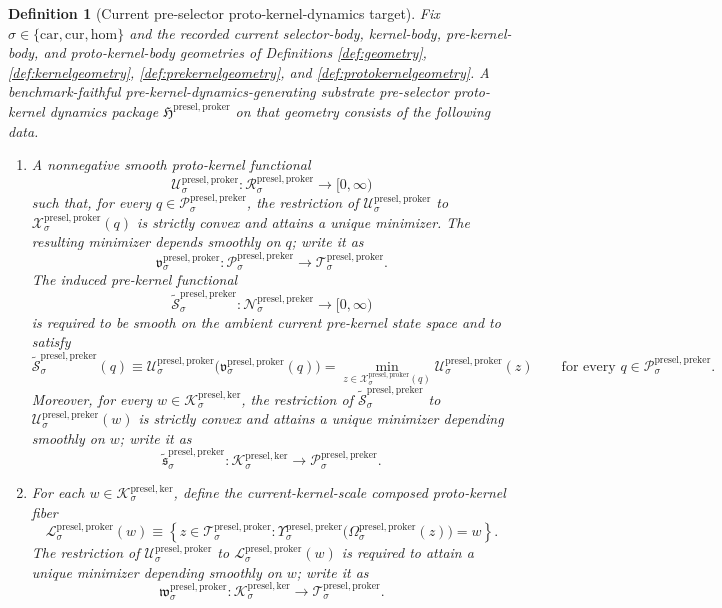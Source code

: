 \documentclass[11pt]{article}
\newcommand{\Car}{\mathrm{car}}
\newcommand{\Cur}{\mathrm{cur}}
\newcommand{\Hom}{\mathrm{hom}}
\newcommand{\KernelBody}[1]{\mathcal K_{#1}^{\mathrm{presel,ker}}}
\newcommand{\PreKernelSpace}[1]{\mathcal N_{#1}^{\mathrm{presel,preker}}}
\newcommand{\PreKernelBody}[1]{\mathcal P_{#1}^{\mathrm{presel,preker}}}
\newcommand{\PreKernelProj}[1]{\Upsilon_{#1}^{\mathrm{presel,preker}}}
\newcommand{\PreKernelFiber}[2]{\mathcal U_{#1}^{\mathrm{presel,preker}}(#2)}
\newcommand{\ProtoKernelPackage}{\mathfrak H^{\mathrm{presel,proker}}}
\newcommand{\ProtoKernelSpace}[1]{\mathcal R_{#1}^{\mathrm{presel,proker}}}
\newcommand{\ProtoKernelBody}[1]{\mathcal T_{#1}^{\mathrm{presel,proker}}}
\newcommand{\ProtoKernelProj}[1]{\Omega_{#1}^{\mathrm{presel,proker}}}
\newcommand{\ProtoKernelFiber}[2]{\mathcal X_{#1}^{\mathrm{presel,proker}}(#2)}
\newcommand{\ProtoKernelFunctional}[1]{\mathscr U_{#1}^{\mathrm{presel,proker}}}
\newcommand{\ProtoKernelMinLift}[1]{\mathfrak v_{#1}^{\mathrm{presel,proker}}}
\newcommand{\ProtoKernelKernelFiber}[2]{\mathcal L_{#1}^{\mathrm{presel,proker}}(#2)}
\newcommand{\ProtoKernelKernelMin}[1]{\mathfrak w_{#1}^{\mathrm{presel,proker}}}
\newcommand{\InducedPreKernelFunctional}[1]{\widetilde{\mathscr S}_{#1}^{\mathrm{presel,preker}}}
\newcommand{\InducedPreKernelMinLift}[1]{\widetilde{\mathfrak s}_{#1}^{\mathrm{presel,preker}}}
\newtheorem{definition}{Definition}
\begin{document}
\begin{definition}[Current pre-selector proto-kernel-dynamics target]
\label{def:protokerneltarget}
Fix \(\sigma\in\{\Car,\Cur,\Hom\}\) and the recorded current selector-body, kernel-body, pre-kernel-body, and proto-kernel-body geometries of Definitions \ref{def:geometry}, \ref{def:kernelgeometry}, \ref{def:prekernelgeometry}, and \ref{def:protokernelgeometry}. A \emph{benchmark-faithful pre-kernel-dynamics-generating substrate pre-selector proto-kernel dynamics package} \(\ProtoKernelPackage\) on that geometry consists of the following data.
\begin{enumerate}
    \item A nonnegative smooth proto-kernel functional
    \[
    \ProtoKernelFunctional{\sigma}:\ProtoKernelSpace{\sigma}\to[0,\infty)
    \]
    such that, for every \(q\in\PreKernelBody{\sigma}\), the restriction of \(\ProtoKernelFunctional{\sigma}\) to \(\ProtoKernelFiber{\sigma}{q}\) is strictly convex and attains a unique minimizer. The resulting minimizer depends smoothly on \(q\); write it as
    \[
    \ProtoKernelMinLift{\sigma}:\PreKernelBody{\sigma}\to\ProtoKernelBody{\sigma}.
    \]
    The induced pre-kernel functional
    \[
    \InducedPreKernelFunctional{\sigma}:\PreKernelSpace{\sigma}\to[0,\infty)
    \]
    is required to be smooth on the ambient current pre-kernel state space and to satisfy
    \[
    \InducedPreKernelFunctional{\sigma}(q)
    \equiv
    \ProtoKernelFunctional{\sigma}\bigl(\ProtoKernelMinLift{\sigma}(q)\bigr)
    =
    \min_{z\in\ProtoKernelFiber{\sigma}{q}}
    \ProtoKernelFunctional{\sigma}(z)
    \qquad
    \text{for every }
    q\in\PreKernelBody{\sigma}.
    \]
    Moreover, for every \(w\in\KernelBody{\sigma}\), the restriction of \(\InducedPreKernelFunctional{\sigma}\) to \(\PreKernelFiber{\sigma}{w}\) is strictly convex and attains a unique minimizer depending smoothly on \(w\); write it as
    \[
    \InducedPreKernelMinLift{\sigma}:\KernelBody{\sigma}\to\PreKernelBody{\sigma}.
    \]
    \item For each \(w\in\KernelBody{\sigma}\), define the current-kernel-scale composed proto-kernel fiber
    \[
    \ProtoKernelKernelFiber{\sigma}{w}
    \equiv
    \left\{
    z\in\ProtoKernelBody{\sigma}:
    \PreKernelProj{\sigma}\bigl(\ProtoKernelProj{\sigma}(z)\bigr)=w
    \right\}.
    \]
    The restriction of \(\ProtoKernelFunctional{\sigma}\) to \(\ProtoKernelKernelFiber{\sigma}{w}\) is required to attain a unique minimizer depending smoothly on \(w\); write it as
    \[
    \ProtoKernelKernelMin{\sigma}:\KernelBody{\sigma}\to\ProtoKernelBody{\sigma}.
\]
\end{enumerate}
\end{definition}
\end{document}
